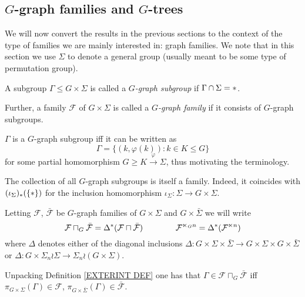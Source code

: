 \documentclass[a4paper,10pt]{article}%
\begin{document}
\subsection{$G$-graph families and $G$-trees}


We will now convert the results in the previous sections to the context of the type of families we are mainly interested in: graph families. 
We note that in this section we use $\Sigma$ to denote a general group (usually meant to be some type of permutation group).


\begin{definition}
  A subgroup $\Gamma \leq G \times \Sigma$ is called a
  \textit{$G$-graph subgroup} if $\Gamma \cap \Sigma = \**$. 

  Further, a family $\mathcal{F}$ of $G \times \Sigma$ is called a \textit{$G$-graph family} if it consists of $G$-graph subgroups.
\end{definition}


\begin{remark}\label{GRAPH REM}
  $\Gamma$ is a $G$-graph subgroup iff it can be written as
  \[
  \Gamma = 
  \{
  (k,\varphi(k)) : k \in K \leq G
  \}
  \]
  for some partial homomorphism $G \geq K \xrightarrow{\varphi} \Sigma$, thus motivating the terminology.
\end{remark}


\begin{remark}
  The collection of all $G$-graph subgroups is itself a family. Indeed, it coincides with 
  $(\iota_{\Sigma})_{\**}(\{\**\})$
  for the inclusion homomorphism 
  $\iota_{\Sigma} \colon \Sigma \to G \times \Sigma$.
\end{remark}


\begin{notation}\label{SEMIDIRG NOT}
  Letting $\mathcal{F}$, $\bar{\mathcal{F}}$ be $G$-graph families of $G \times \Sigma$ and $G \times \bar{\Sigma}$ we will write
  \[
  \mathcal{F} \sqcap_G \bar{\mathcal{F}} 
  = \Delta^{\**} (\mathcal{F} \sqcap \bar{\mathcal{F}} )
  \qquad \qquad
  \mathcal{F}^{\ltimes_G n} = \Delta^{\**} (\mathcal{F}^{\ltimes n})
  \]
  where $\Delta$ denotes either of the diagonal inclusions
  $\Delta \colon 
  G \times \Sigma \times \bar{\Sigma} \to 
  G \times \Sigma \times G \times \bar{\Sigma}$
  or 
  $\Delta \colon G \times \Sigma_n \wr \Sigma \to 
  \Sigma_n \wr (G \times \Sigma)$.
\end{notation}


\begin{remark}\label{UNPACKINGSQCAP REM}
  Unpacking Definition \ref{EXTERINT DEF} one has that 
  $\Gamma \in \mathcal{F} \sqcap_G \bar{\mathcal{F}}$ iff
  $\pi_{G \times \Sigma}(\Gamma) \in \mathcal{F}$,
  $\pi_{G \times \bar{\Sigma}}(\Gamma) \in \bar{\mathcal{F}}$.
\end{remark}
\end{document}
